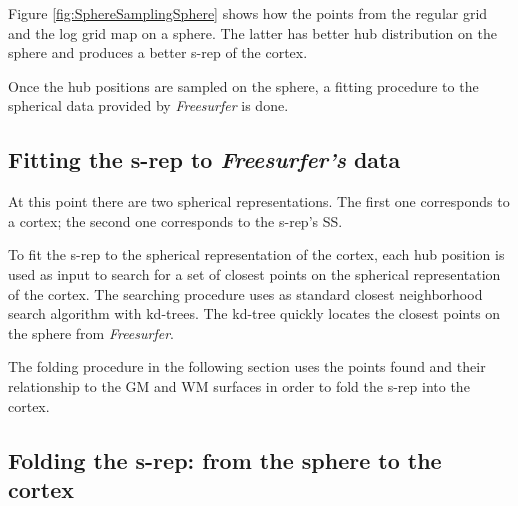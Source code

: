 Figure \ref{fig:SphereSamplingSphere} shows how the points from the regular grid and the log grid map 
on a sphere. The latter has better hub distribution on the sphere and produces a better s-rep of the cortex. 

Once the hub positions are sampled on the sphere, a fitting procedure to the spherical data provided by \textit{Freesurfer} is done.

\subsection{Fitting the s-rep to \textit{Freesurfer's} data}

At this point there are two spherical representations. 
The first one corresponds to a cortex;
the second one corresponds to the s-rep's SS.

To fit the s-rep to the spherical representation of the cortex,
each hub position is used as input to search for a set of closest points on 
the spherical representation of the cortex.
The searching procedure uses as standard closest neighborhood search algorithm 
with kd-trees. The kd-tree quickly locates the closest points on the sphere from \textit{Freesurfer}.

The folding procedure in the following section uses the points found
and their relationship to the GM and WM surfaces in order to fold the s-rep into the cortex.

\subsection{Folding the s-rep: from the sphere to the cortex}


